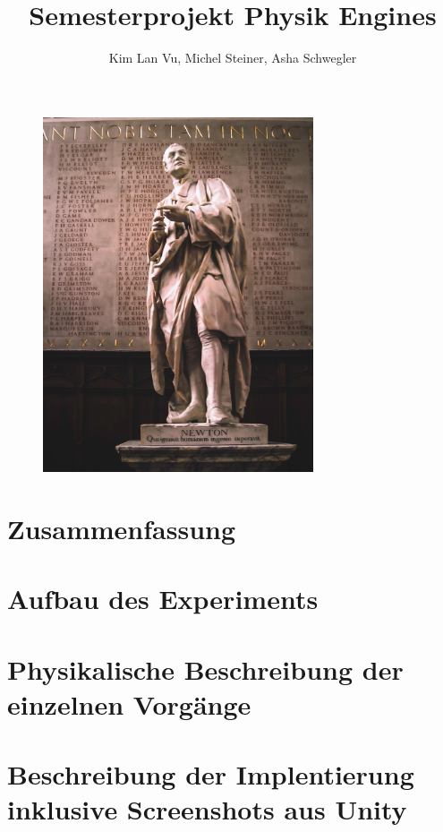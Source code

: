 \documentclass{article}[11pt,paper=A4, margin=1cm]
\title{Semesterprojekt Physik Engines}
\author{Kim Lan Vu, Michel Steiner, Asha Schwegler}
\begin{document}
\maketitle
\begin{figure}[H]
    \begin{center}
        \centerline{\includegraphics[width=80mm]{./images/NEWTON}}
        \label{fig:Einstein}
    \end{center}
\end{figure}
\newpage

\tableofcontents



\newpage
\newpage
\section {Zusammenfassung}

\newpage
\section {Aufbau des Experiments}

\newpage
\section {Physikalische Beschreibung der einzelnen Vorgänge}

\newpage
\section {Beschreibung der Implentierung inklusive Screenshots aus Unity}

\newpage
\end{document}
